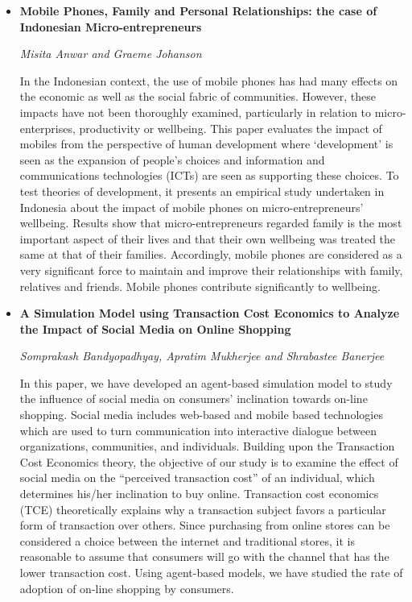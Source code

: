 \documentclass[a4paper,12pt,svgnames]{report}
\begin{document}
\begin{itemize}
\item \textbf{Mobile Phones, Family and Personal Relationships: the case of
Indonesian Micro-entrepreneurs}

\textit{Misita Anwar and Graeme Johanson}

In the Indonesian context, the use of mobile phones has had many effects on the
economic as well as the social fabric of communities. However, these impacts
have not been thoroughly examined, particularly in relation to
micro-enterprises, productivity or wellbeing. This paper evaluates the impact of
mobiles from the perspective of human development where ‘development’ is seen as
the expansion of people’s choices and information and communications
technologies (ICTs) are seen as supporting these choices. To test theories of
development, it presents an empirical study undertaken in Indonesia about the
impact of mobile phones on micro-entrepreneurs’ wellbeing. Results show that
micro-entrepreneurs regarded family is the most important aspect of their lives
and that their own wellbeing was treated the same at that of their families.
Accordingly, mobile phones are considered as a very significant force to
maintain and improve their relationships with family, relatives and friends.
Mobile phones contribute significantly to wellbeing.

\item \textbf{A Simulation Model using Transaction Cost Economics to Analyze the
Impact of Social Media on Online Shopping}

\textit{Somprakash Bandyopadhyay, Apratim Mukherjee and Shrabastee Banerjee}

In this paper, we have developed an agent-based simulation model to study the
influence of social media on consumers’ inclination towards on-line shopping.
Social media includes web-based and mobile based technologies which are used to
turn communication into interactive dialogue between organizations, communities,
and individuals. Building upon the Transaction Cost Economics theory, the
objective of our study is to examine the effect of social media on the
“perceived transaction cost” of an individual, which determines his/her
inclination to buy online. Transaction cost economics (TCE) theoretically
explains why a transaction subject favors a particular form of transaction over
others. Since purchasing from online stores can be considered a choice between
the internet and traditional stores, it is reasonable to assume that consumers
will go with the channel that has the lower transaction cost. Using agent-based
models, we have studied the rate of adoption of on-line shopping by consumers.


\end{itemize}
\end{document}
